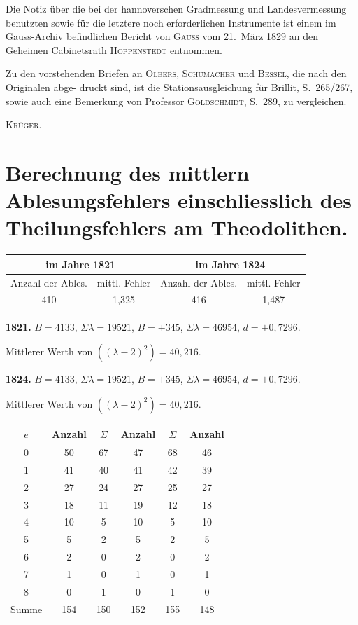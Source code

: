 \documentclass[12pt,a4paper]{article}
\theoremstyle{plain}
\theoremstyle{definition}
\theoremstyle{remark}
\begin{document}
Die Notiz über die bei der hannoverschen Gradmessung und Landesvermessung benutzten sowie
für die letztere noch erforderlichen Instrumente ist einem im Gauss-Archiv befindlichen Bericht von \textsc{Gauss}
vom 21.\ März 1829 an den Geheimen Cabinetsrath \textsc{Hoppenstedt} entnommen.

Zu den vorstehenden Briefen an \textsc{Olbers}, \textsc{Schumacher} und \textsc{Bessel}, die nach den Originalen abge-
druckt sind, ist die Stationsausgleichung für Brillit, S.\ 265/267, sowie auch eine Bemerkung von Professor
\textsc{Goldschmidt}, S.\ 289, zu vergleichen.

\hfill\textsc{Krüger.}

\newpage
\section*{Berechnung des mittlern Ablesungsfehlers einschliesslich des Theilungsfehlers am Theodolithen.}

\bigskip
\noindent
\begin{tabular}{|c|c|c|c|}
\hline
\multicolumn{2}{|c|}{im Jahre 1821} & \multicolumn{2}{c|}{im Jahre 1824} \\
\hline
Anzahl der Ables. & mittl. Fehler & Anzahl der Ables. & mittl. Fehler \\
\hline
410 & 1,325 & 416 & 1,487 \\
\hline
\end{tabular}

\bigskip
\noindent
\textbf{1821.} $B = 4133$, $\Sigma\lambda = 19521$, $B = +345$, $\Sigma\lambda = 46954$, $d = +0{,}7296$.

Mittlerer Werth von $((\lambda-2)^2) = 40{,}216$.

\bigskip
\noindent
\textbf{1824.} $B = 4133$, $\Sigma\lambda = 19521$, $B = +345$, $\Sigma\lambda = 46954$, $d = +0{,}7296$.

Mittlerer Werth von $((\lambda-2)^2) = 40{,}216$.

\bigskip
\noindent
\begin{tabular}{|c|c|c|c|c|c|}
\hline
$e$ & Anzahl & $\Sigma$ & Anzahl & $\Sigma$ & Anzahl \\
\hline
0 & 50 & 67 & 47 & 68 & 46 \\
1 & 41 & 40 & 41 & 42 & 39 \\
2 & 27 & 24 & 27 & 25 & 27 \\
3 & 18 & 11 & 19 & 12 & 18 \\
4 & 10 & 5 & 10 & 5 & 10 \\
5 & 5 & 2 & 5 & 2 & 5 \\
6 & 2 & 0 & 2 & 0 & 2 \\
7 & 1 & 0 & 1 & 0 & 1 \\
8 & 0 & 1 & 0 & 1 & 0 \\
\hline
Summe & 154 & 150 & 152 & 155 & 148 \\
\hline
\end{tabular}
\end{document}
